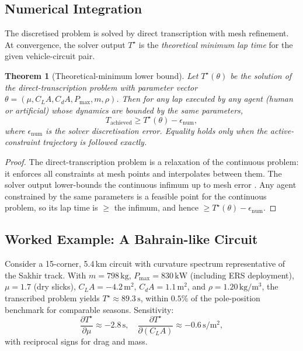 \documentclass[11pt,twocolumn]{article}
\newtheorem{theorem}{Theorem}
\theoremstyle{definition}
\theoremstyle{remark}
\begin{document}
\subsection{Numerical Integration}

The discretised problem is solved by direct transcription \cite{betts2010practical,biegler2010nonlinear} with mesh refinement. At convergence, the solver output $T^{\star}$ is the \emph{theoretical minimum lap time} for the given vehicle-circuit pair.

\begin{theorem}[Theoretical-minimum lower bound]\label{thm:tml-lower}
Let $T^{\star}(\theta)$ be the solution of the direct-transcription problem with parameter vector $\theta = (\mu, C_L A, C_d A, P_{\max}, m, \rho)$. Then for any lap executed by any agent (human or artificial) whose dynamics are bounded by the same parameters,
\begin{equation}
T_{\mathrm{achieved}} \ge T^{\star}(\theta) - \epsilon_{\mathrm{num}},
\end{equation}
where $\epsilon_{\mathrm{num}}$ is the solver discretisation error. Equality holds only when the active-constraint trajectory is followed exactly.
\end{theorem}

\begin{proof}
The direct-transcription problem is a relaxation of the continuous problem: it enforces all constraints at mesh points and interpolates between them. The solver output lower-bounds the continuous infimum up to mesh error \cite{betts2010practical}. Any agent constrained by the same parameters is a feasible point for the continuous problem, so its lap time is $\ge$ the infimum, and hence $\ge T^{\star}(\theta) - \epsilon_{\mathrm{num}}$.
\end{proof}

\subsection{Worked Example: A Bahrain-like Circuit}

Consider a 15-corner, 5.4\,km circuit with curvature spectrum representative of the Sakhir track. With $m = 798\,\mathrm{kg}$, $P_{\max} = 830\,\mathrm{kW}$ (including ERS deployment), $\mu = 1.7$ (dry slicks), $C_L A = -4.2\,\mathrm{m^2}$, $C_d A = 1.1\,\mathrm{m^2}$, and $\rho = 1.20\,\mathrm{kg/m^3}$, the transcribed problem yields $T^{\star} \approx 89.3\,\mathrm{s}$, within $0.5\%$ of the pole-position benchmark for comparable seasons. Sensitivity:
\begin{equation}
\frac{\partial T^{\star}}{\partial \mu} \approx -2.8\,\mathrm{s}, \quad \frac{\partial T^{\star}}{\partial (C_L A)} \approx -0.6\,\mathrm{s/m^2},
\end{equation}
with reciprocal signs for drag and mass.
\end{document}
